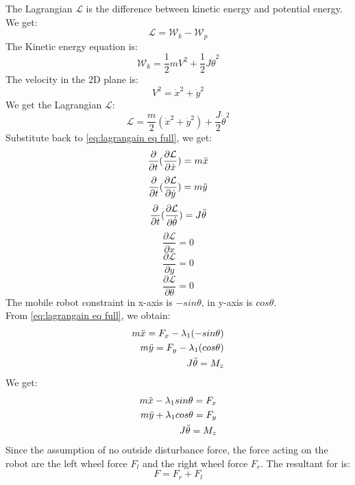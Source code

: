 The Lagrangian \(\mathcal{L}\) is the difference between kinetic energy and potential energy. We get:
\begin{equation}
	\mathcal{L} = \mathcal{W}_k - \mathcal{W}_p 
\end{equation}
The Kinetic energy equation is:
\begin{equation}
	\mathcal{W}_k = \frac{1}{2}mV^2 + \frac{1}{2} J\Dot{\theta}^2
\end{equation}
The velocity in the 2D plane is:
\begin{equation}
	V^2 = \Dot{x}^2 + \Dot{y}^2
\end{equation}
We get the Lagrangian \(\mathcal{L}\):
\begin{equation}
	\mathcal{L} = \frac{m}{2}(\Dot{x}^2 + \Dot{y}^2) + \frac{J}{2}\Dot{\theta}^2
\end{equation}
Substitute back to \autoref{eq:lagrangain eq full}, we get:
\[\frac{\partial}{\partial t}(\frac{\partial \mathcal{L}}{\partial \Dot{x}}) = m\Ddot{x}\] 
\[\frac{\partial}{\partial t}(\frac{\partial \mathcal{L}}{\partial \Dot{y}}) = m\Ddot{y}\] 
\[\frac{\partial}{\partial t}(\frac{\partial \mathcal{L}}{\partial \Dot{\theta}}) = J\Ddot{\theta}\]
\[\frac{\partial \mathcal{L}}{\partial x} = 0\] 
\[\frac{\partial \mathcal{L}}{\partial y} = 0\] 
\[\frac{\partial \mathcal{L}}{\partial \theta} = 0\] 
The mobile robot constraint in x-axis is \(-sin\theta\), in y-axis is \(cos\theta\).\\
From \autoref{eq:lagrangain eq full}, we obtain:
\begin{equation}
	\begin{split}
		m\Ddot{x} = F_x - \lambda_1(-sin\theta) \\
		m\Ddot{y} = F_y - \lambda_1(cos\theta)\\
		J\Ddot{\theta} = M_z
	\end{split}
\end{equation}
We get:
\begin{equation}
	\begin{split}
		m\Ddot{x} - \lambda_1 sin \theta= F_x\\
		m\Ddot{y} + \lambda_1 cos \theta= F_y\\
		J\Ddot{\theta} = M_z
	\end{split}
\end{equation}
Since the assumption of no outside disturbance force, the force acting on the robot are the left wheel force \(F_l\) and the right wheel force \(F_r\). The resultant for is:
\begin{equation}
	F = F_r + F_l
\end{equation}
